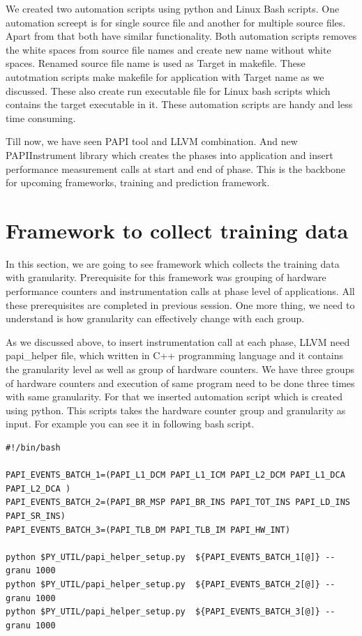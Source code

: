 \par We created two automation scripts using python and Linux Bash scripts. One automation screept is for single source file and another for multiple source files. Apart from that both have similar functionality. Both automation scripts removes the white spaces from source file names and create new name without white spaces. Renamed source file name is used as Target in makefile. These autotmation scripts make makefile for application with Target name as we discussed. These also create run executable file for Linux bash scripts which contains the target executable in it. These automation scripts are handy and less time consuming. 
  
\par Till now, we have seen PAPI tool and LLVM combination. And new PAPIInstrument library which creates the phases into application and insert performance measurement calls at start and end of phase. This is the backbone for upcoming frameworks, training and prediction framework.
  
\section{Framework to collect training data}
In this section, we are going to see framework which collects the training data with granularity. Prerequisite for this framework was grouping of hardware performance counters and instrumentation calls at phase level of applications. All these prerequisites are completed in previous session. One more thing, we need to understand is how granularity can effectively change with each group. 

\par As we discussed above, to insert instrumentation call at each phase, LLVM need papi\_helper file, which written in C++ programming language and it contains the granularity level as well as group of hardware counters. We have three groups of hardware counters and execution of same program need to be done three times with same granularity. For that we inserted automation script which is created using python. This scripts takes the hardware counter group and granularity as input. For example you can see it in following bash script. 

\begin{lstlisting}
#!/bin/bash

PAPI_EVENTS_BATCH_1=(PAPI_L1_DCM PAPI_L1_ICM PAPI_L2_DCM PAPI_L1_DCA PAPI_L2_DCA )
PAPI_EVENTS_BATCH_2=(PAPI_BR_MSP PAPI_BR_INS PAPI_TOT_INS PAPI_LD_INS PAPI_SR_INS)
PAPI_EVENTS_BATCH_3=(PAPI_TLB_DM PAPI_TLB_IM PAPI_HW_INT)

python $PY_UTIL/papi_helper_setup.py  ${PAPI_EVENTS_BATCH_1[@]} --granu 1000
python $PY_UTIL/papi_helper_setup.py  ${PAPI_EVENTS_BATCH_2[@]} --granu 1000
python $PY_UTIL/papi_helper_setup.py  ${PAPI_EVENTS_BATCH_3[@]} --granu 1000

\end{lstlisting}

